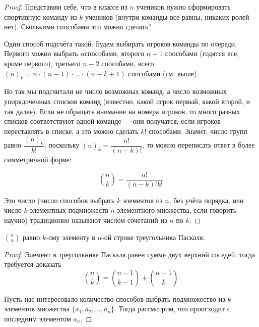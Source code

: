 \documentclass[a4paper]{article}
\begin{document}
\begin{colloq}
        \begin{proof}
            Представим себе, что в классе из $n$ учеников нужно сформировать спортивную команду из $k$ учеников (внутри команды все равны, никаких ролей нет). Сколькими способами это можно сделать? 

            Один способ подсчёта такой. Будем выбирать игроков команды по очереди. Первого можно выбрать $n $способами, второго $n - 1$ способами (годятся все, кроме первого), третьего $n - 2$ способами, всего $(n)_k = n \cdot (n - 1) \cdot \dots \cdot (n - k + 1)$ способами (см. выше). 

            Но так мы подсчитали не число возможных команд, а число возможных упорядоченных списков команд (известно, какой игрок первый, какой второй, и так далее). Если не обращать внимание на номера игроков, то много разных списков соответствуют одной команде --- они получатся, если игроков переставлять в списке, а это можно сделать $k!$ способами. Значит, число групп равно $\dfrac{(n)_k}{k!}$; поскольку $(n)_k = \dfrac{n!}{(n - k)!}$, то можно переписать ответ в более симметричной форме:

            \begin{equation*}
                \binom{n}{k} = \dfrac{n!}{(n - k)! k!}
            \end{equation*}

            Это число (число способов выбрать $k$ элементов из $n$, без учёта порядка, или число $k$-элементных подмножеств $n$-элементного множества, если говорить научно) традиционно называют числом сочетаний из $n$ по $k$.
        \end{proof}

        \begin{statement}
            $\displaystyle\binom{n}{k}$ равно $k$-ому элементу в $n$-ой строке треугольника Паскаля.
        \end{statement}
        \begin{proof}
            Элемент в треугольнике Паскаля равен сумме двух верхний соседей, тогда требуется доказать
            \begin{equation*}
                \binom{n}{k} = \binom{n - 1}{k - 1} + \binom{n - 1}{k}
            \end{equation*}

            Пусть нас интересовало количество способов выбрать подмножество из $k$ элементов множества $\{a_1, a_2, \dots, a_n\}$. Тогда рассмотрим, что происходит с последним элементом $a_n$. 


\end{proof}
\end{colloq}
\end{document}
